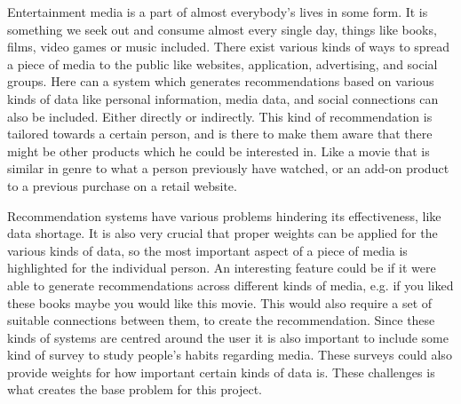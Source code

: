 Entertainment media is a part of almost everybody's lives in some form. It is something we seek out and consume almost every single day, things like books, films, video games or music included. There exist various kinds of ways to spread a piece of media to the public like websites, application, advertising, and social groups. Here can a system which generates recommendations based on various kinds of data like personal information, media data, and social connections can also be included. Either directly or indirectly. This kind of recommendation is tailored towards a certain person, and is there to make them aware that there might be other products which he could be interested in. Like a movie that is similar in genre to what a person previously have watched, or an add-on product to a previous purchase on a retail website.

Recommendation systems have various problems hindering its effectiveness, like data shortage. It is also very crucial that proper weights can be applied for the various kinds of data, so the most important aspect of a piece of media is highlighted for the individual person. An interesting feature could be if it were able to generate recommendations across different kinds of media, e.g. if you liked these books maybe you would like this movie. This would also require a set of suitable connections between them, to create the recommendation. Since these kinds of systems are centred around the user it is also important to include some kind of survey to study people's habits regarding media. These surveys could also provide weights for how important certain kinds of data is. These challenges is what creates the base problem for this project.